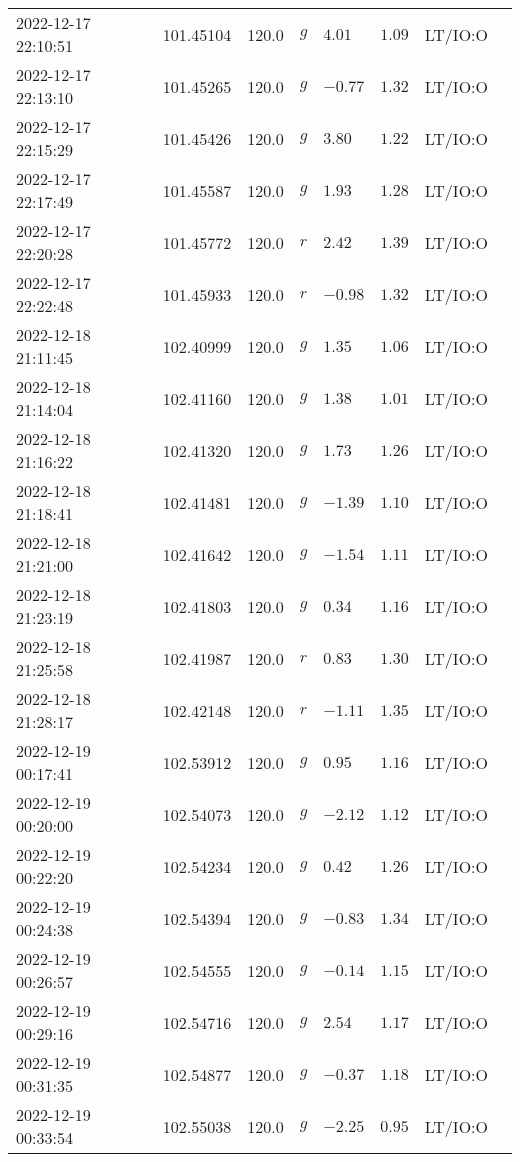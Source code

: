 \documentclass{nature_plusfigure}
\begin{document}
\begin{supplement}
\begin{center}
\begin{longtable}{llllllll}
2022-12-17 22:10:51 & 101.45104 & 120.0 & $g$ & $4.01$ & $1.09$ & LT/IO:O &  \\ 
2022-12-17 22:13:10 & 101.45265 & 120.0 & $g$ & $-0.77$ & $1.32$ & LT/IO:O &  \\ 
2022-12-17 22:15:29 & 101.45426 & 120.0 & $g$ & $3.80$ & $1.22$ & LT/IO:O &  \\ 
2022-12-17 22:17:49 & 101.45587 & 120.0 & $g$ & $1.93$ & $1.28$ & LT/IO:O &  \\ 
2022-12-17 22:20:28 & 101.45772 & 120.0 & $r$ & $2.42$ & $1.39$ & LT/IO:O &  \\ 
2022-12-17 22:22:48 & 101.45933 & 120.0 & $r$ & $-0.98$ & $1.32$ & LT/IO:O &  \\ 
2022-12-18 21:11:45 & 102.40999 & 120.0 & $g$ & $1.35$ & $1.06$ & LT/IO:O &  \\ 
2022-12-18 21:14:04 & 102.41160 & 120.0 & $g$ & $1.38$ & $1.01$ & LT/IO:O &  \\ 
2022-12-18 21:16:22 & 102.41320 & 120.0 & $g$ & $1.73$ & $1.26$ & LT/IO:O &  \\ 
2022-12-18 21:18:41 & 102.41481 & 120.0 & $g$ & $-1.39$ & $1.10$ & LT/IO:O &  \\ 
2022-12-18 21:21:00 & 102.41642 & 120.0 & $g$ & $-1.54$ & $1.11$ & LT/IO:O &  \\ 
2022-12-18 21:23:19 & 102.41803 & 120.0 & $g$ & $0.34$ & $1.16$ & LT/IO:O &  \\ 
2022-12-18 21:25:58 & 102.41987 & 120.0 & $r$ & $0.83$ & $1.30$ & LT/IO:O &  \\ 
2022-12-18 21:28:17 & 102.42148 & 120.0 & $r$ & $-1.11$ & $1.35$ & LT/IO:O &  \\ 
2022-12-19 00:17:41 & 102.53912 & 120.0 & $g$ & $0.95$ & $1.16$ & LT/IO:O &  \\ 
2022-12-19 00:20:00 & 102.54073 & 120.0 & $g$ & $-2.12$ & $1.12$ & LT/IO:O &  \\ 
2022-12-19 00:22:20 & 102.54234 & 120.0 & $g$ & $0.42$ & $1.26$ & LT/IO:O &  \\ 
2022-12-19 00:24:38 & 102.54394 & 120.0 & $g$ & $-0.83$ & $1.34$ & LT/IO:O &  \\ 
2022-12-19 00:26:57 & 102.54555 & 120.0 & $g$ & $-0.14$ & $1.15$ & LT/IO:O &  \\ 
2022-12-19 00:29:16 & 102.54716 & 120.0 & $g$ & $2.54$ & $1.17$ & LT/IO:O &  \\ 
2022-12-19 00:31:35 & 102.54877 & 120.0 & $g$ & $-0.37$ & $1.18$ & LT/IO:O &  \\ 
2022-12-19 00:33:54 & 102.55038 & 120.0 & $g$ & $-2.25$ & $0.95$ & LT/IO:O &  \\ 

\end{longtable}
\end{center}
\end{supplement}
\end{document}
